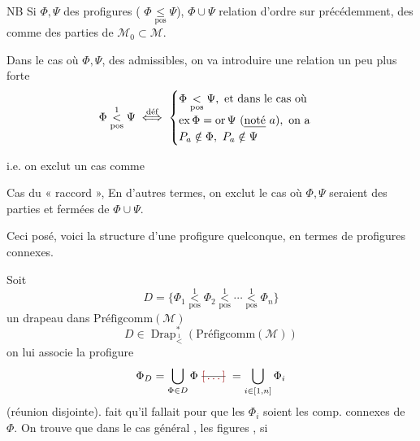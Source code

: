 \documentclass[11pt,a4paper]{article}
\begin{document}
NB Si $\Phi,\Psi$  des profigures ( $\Phi \underset{\mathrm{pos}}{\leq} \Psi$),  $\Phi\cup\Psi$ \ill{} relation d'ordre sur \ill{} précédemment, \ill{} des  comme  des parties de $\mathcal{M}_0\subset\mathcal{M}$. 

Dans le cas où $\Phi,\Psi$,  des  admissibles, on va introduire une relation un peu plus forte
\[ \Phi \underset{\mathrm{pos}}{\overset{1}{<}} \Psi \overset{\text{déf}}{\iff}
\begin{cases}
\Phi \underset{\mathrm{pos}}{<} \Psi, \text{ et dans le cas où} \\
\operatorname{ex}\Phi = \operatorname{or}\Psi \ (\text{\uncertain{noté} } a), \text{ on a} \\
P_a\notin\Phi,\ P_a\notin\Psi
\end{cases} \]

i.e. on exclut un cas comme


Cas du « raccord »,  En d'autres termes, on exclut le cas où $\Phi,\Psi$ seraient  des parties  et fermées de $\Phi\cup\Psi$.

Ceci posé, voici la structure d'une profigure quelconque, en termes de profigures connexes.

\struck{\ill{}} Soit
\[ D = \{\Phi_1 \underset{\mathrm{pos}}{\overset{1}{<}} \Phi_2 \underset{\mathrm{pos}}{\overset{1}{<}} \cdots \underset{\mathrm{pos}}{\overset{1}{<}} \Phi_n\} \]
un drapeau  dans $\text{Préfigcomm}(\mathcal{M})$
\[ D \in \operatorname{Drap}^*_{\overset{1}{<}}(\text{Préfigcomm}(\mathcal{M})) \]
on lui associe la profigure
\[ \Phi_D = \bigcup_{\Phi\in D}\Phi \ \text{\struck{$\ill{}$}}\ = \bigcup_{i\in[1,n]}\Phi_i \]
(réunion disjointe).  fait qu'il fallait pour que les $\Phi_i$ soient les comp. connexes de $\Phi$. On trouve \ill{} que dans le cas général \struck{\ill{}}, \struck{\ill{}} les figures \ill{}  \ill{}, si
\end{document}
